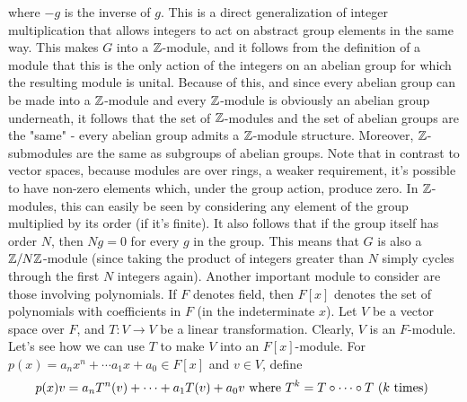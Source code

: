 \documentclass{article}
\begin{document}
where $ - g $ is the inverse of $ g $. This is a direct generalization of integer multiplication that allows integers to act on abstract group elements in the same way. This makes $ G $ into a $ \mathbb{Z} $-module, and it follows from the definition of a module that this is the only action of the integers on an abelian group for which the resulting module is unital. Because of this, and since every abelian group can be made into a $ \mathbb{Z} $-module and every $ \mathbb{Z} $-module is obviously an abelian group underneath, it follows that the set of $ \mathbb{Z} $-modules and the set of abelian groups are the "same" - every abelian group admits a $ \mathbb{Z} $-module structure. Moreover, $ \mathbb{Z} $-submodules are the same as subgroups of abelian groups. Note that in contrast to vector spaces, because modules are over rings, a weaker requirement, it's possible to have non-zero elements which, under the group action, produce zero. In $ \mathbb{Z} $-modules, this can easily be seen by considering any element of the group multiplied by its order (if it's finite). It also follows that if the group itself has order $ N $, then $ N g = 0 $ for every $ g $ in the group. This means that $ G $ is also a $ \mathbb{Z} / N \mathbb{Z} $-module (since taking the product of integers greater than $ N $ simply cycles through the first $ N $ integers again).
\nn
Another important module to consider are those involving polynomials. If $ F $ denotes field, then $ F[x] $ denotes the set of polynomials with coefficients in $ F $ (in the indeterminate $ x $). Let $ V $ be a vector space over $ F $, and $ T: V \rightarrow V $ be a linear transformation. Clearly, $ V $ is an $ F $-module. Let's see how we can use $ T $ to make $ V $ into an $ F[x] $-module. For $ p(x) = a_n x^n + \cdots a_1 x + a_0 \in F[x] $ and $ v \in V $, define
$$ p(x) v = a_n T^n(v) + \cdots + a_1 T(v) + a_0 v \text{ where } T^k = T \circ \cdots \circ T \text{ ($ k $ times) } $$
\end{document}
